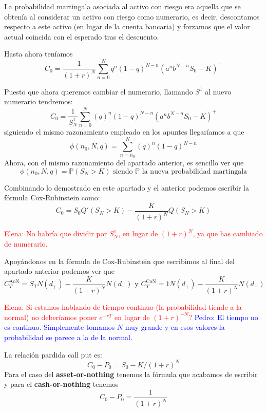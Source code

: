 \begin{problem}[1]
\spart

La probabilidad martingala asociada al activo con riesgo era aquella que se obtenía al considerar un activo con riesgo como numerario, es decir, descontamos respecto a este activo (en lugar de la cuenta bancaria) y forzamos que el valor actual coincida con el esperado tras el descuento.

Hasta ahora teníamos
\[C_0 = \frac{1}{(1+r)^N}\sum_{n=0}^Nq^n(1-q)^{N-n}(a^nb^{N-n}S_0-K)^+\]

Puesto que ahora queremos cambiar el numerario, llamando $S^1$ al nuevo numerario tendremos:
\[C_0 = \frac{1}{S^1_N}\sum_{n=0}^N(q)^n(1-q)^{N-n}(a^nb^{N-n}S_0-K)^+\]
siguiendo el mismo razonamiento empleado en los apuntes llegaríamos a que
\[\phi(n_0,N,q) = \sum_{n=n_0}^N(q)^n(1-q)^{N-n}\]
Ahora, con el mismo razonamiento del apartado anterior, es sencillo ver que
\[\phi(n_0,N,q) = \mathbb{P}(S_N>K) \text{ siendo } \mathbb{P} \text{ la nueva probabilidad martingala}\]

Combinando lo demostrado en este apartado y el anterior podemos escribir la fórmula Cox-Rubinstein como:
\[C_0=S_0Q'(S_N>K) - \frac{K}{(1+r)^N}Q(S_N>K)\]

\textcolor{red}{Elena: No habría que dividir por $S^{1}_{N}$, en lugar de $(1+r)^N$, ya que has cambiado de numerario.}\\
\spart

Apoyándonos en la fórmula de Cox-Rubinstein que escribimos al final del apartado anterior podemos ver que
\[C_T^{\text{AoN}}=S_TN(d_+)-\frac{K}{(1+r)^N}N(d_-) \text{ y } C_T^{\text{CoN}}=1N(d_+)-\frac{K}{(1+r)^N}N(d_-)\]

\textcolor{red}{Elena: Si estamos hablando de tiempo continuo (la probabilidad tiende a la normal) no deberíamos poner $e^{-rT}$ en lugar de $(1+r)^{-N}$?}
\textcolor{blue}{Pedro: El tiempo no es continuo. Simplemente tomamos $N$ muy grande y en esos valores la probabilidad se parece a la de la normal.}



\spart

La relación pardida call put es:
\[C_0-P_0=S_0-K/(1+r)^N\]
Para el caso del \textbf{asset-or-nothing} tenemos la fórmula que acabamos de escribir y para el \textbf{cash-or-nothing} tenemos
\[C_0-P_0=\frac{1}{(1+r)^N}\]

\end{problem}

